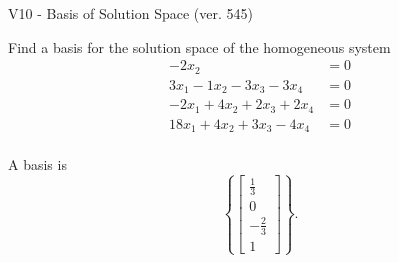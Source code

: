 \begin{exercise}
  \begin{exerciseTitle}V10 - Basis of Solution Space (ver. 545)\end{exerciseTitle}
  \begin{exerciseStatement}
    Find a basis for the solution space of the homogeneous system 
\begin{align*}
 -2 x_ 2 &= 0  \\ 
  3 x_ 1 -1 x_ 2 -3 x_ 3 -3 x_ 4 &= 0  \\ 
  -2 x_ 1 + 4 x_ 2 + 2 x_ 3 + 2 x_ 4 &= 0  \\ 
  18 x_ 1 + 4 x_ 2 + 3 x_ 3 -4 x_ 4 &= 0  \\ 
 \end{align*}


 
  \end{exerciseStatement}

  \begin{exerciseAnswer}
   A basis is   
\[\left\{\left[\begin{array}{c}
\frac{1}{3} \\
0 \\
-\frac{2}{3} \\
1
\end{array}\right]\right\}.\]

  


  \end{exerciseAnswer}
\end{exercise}